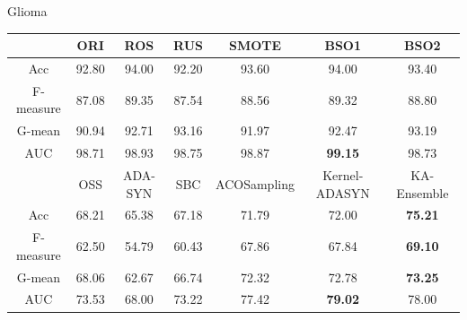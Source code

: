 \documentclass[10pt]{beamer}
\begin{document}
\begin{frame}{Glioma}

\begin{table}[!h]
  	\centering
      \scriptsize
	\begin{tabular}{c|c|c|c|c|c|c}
    \toprule[1.5pt]
    \hline
    			&ORI	&ROS	&RUS	&SMOTE	&BSO1	&BSO2	\\ 
	\hline
    Acc			&92.80	&94.00	&92.20	&93.60	&94.00	&93.40	\\
    \hline
     F-measure	&87.08	&89.35	&87.54	&88.56	&89.32	&88.80\\
	\hline
    G-mean		&90.94	&92.71	&93.16	&91.97	&92.47	&93.19	\\
	\hline
    AUC			&98.71	&98.93	&98.75	&98.87	&\textbf{99.15}	&98.73\\

        \midrule[1.2pt]

                &OSS	&ADA-SYN	&SBC	&ACOSampling	&Kernel-ADASYN	&KA-Ensemble\\
	\hline
    Acc			&68.21	&65.38	&67.18	&71.79	&72.00	&\textbf{75.21}	\\
    \hline
     F-measure	&62.50	&54.79	&60.43	&67.86	&67.84	&\textbf{69.10}\\
	\hline
    G-mean		&68.06	&62.67	&66.74	&72.32	&72.78	&\textbf{73.25}	\\
	\hline
    AUC			&73.53	&68.00	&73.22	&77.42	&\textbf{79.02}	&78.00\\
    	\hline
\bottomrule[1.2pt]
    \end{tabular}
\end{table}

\end{frame}
\end{document}
